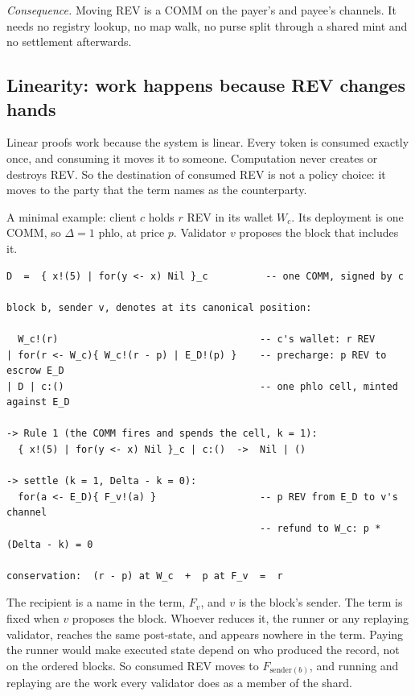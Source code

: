 \documentclass[11pt]{article}
\begin{document}
\emph{Consequence.} Moving REV is a COMM on the payer's and payee's channels. It needs no registry lookup, no map walk, no purse split through a shared mint and no settlement afterwards.

\subsection{Linearity: work happens because REV changes hands}\label{sec:linear}

Linear proofs work because the system is linear. Every token is consumed exactly once, and consuming it moves it to someone. Computation never creates or destroys REV. So the destination of consumed REV is not a policy choice: it moves to the party that the term names as the counterparty.

A minimal example: client $c$ holds $r$ REV in its wallet $W_c$. Its deployment is one COMM, so $\Delta = 1$ phlo, at price $p$. Validator $v$ proposes the block that includes it.

\begin{Verbatim}[fontsize=\footnotesize,frame=single,framesep=6pt]
D  =  { x!(5) | for(y <- x) Nil }_c          -- one COMM, signed by c

block b, sender v, denotes at its canonical position:

  W_c!(r)                                   -- c's wallet: r REV
| for(r <- W_c){ W_c!(r - p) | E_D!(p) }    -- precharge: p REV to escrow E_D
| D | c:()                                  -- one phlo cell, minted against E_D

-> Rule 1 (the COMM fires and spends the cell, k = 1):
  { x!(5) | for(y <- x) Nil }_c | c:()  ->  Nil | ()

-> settle (k = 1, Delta - k = 0):
  for(a <- E_D){ F_v!(a) }                  -- p REV from E_D to v's channel
                                            -- refund to W_c: p * (Delta - k) = 0

conservation:  (r - p) at W_c  +  p at F_v  =  r
\end{Verbatim}

The recipient is a name in the term, $F_v$, and $v$ is the block's sender. The term is fixed when $v$ proposes the block. Whoever reduces it, the runner or any replaying validator, reaches the same post-state, and appears nowhere in the term. Paying the runner would make executed state depend on who produced the record, not on the ordered blocks. So consumed REV moves to $F_{\mathrm{sender}(b)}$, and running and replaying are the work every validator does as a member of the shard.
\end{document}
